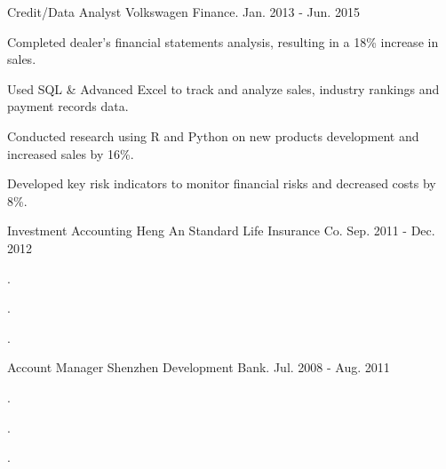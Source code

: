 

\begin{cventries}

  \cventry
    {Credit/Data Analyst} %
    {Volkswagen Finance.} %
    {} %
    {Jan. 2013 - Jun. 2015} %
    {
      \begin{cvitems} %
        \item {Completed dealer's financial statements analysis, resulting in a 18\% increase in sales.}
        \item {Used SQL \& Advanced Excel to track and analyze sales, industry rankings and payment records data.}
        \item {Conducted research using R and Python on new products development and increased sales by 16\%.}
        \item {Developed key risk indicators to monitor financial risks and decreased costs by 8\%.}
      \end{cvitems}
    }

  \cventry
    {Investment Accounting} %
    {Heng An Standard Life Insurance Co.} %
    {} %
    {Sep. 2011 - Dec. 2012} %
    {
      \begin{cvitems} %
        \item {.}
        \item {.}
        \item {.}
      \end{cvitems}
    }

  \cventry
    {Account Manager} %
    {Shenzhen Development Bank.} %
    {} %
    {Jul. 2008 - Aug. 2011} %
    {
      \begin{cvitems} %
        \item {.}
        \item {.}
        \item {.}
      \end{cvitems}
    }

\end{cventries}
